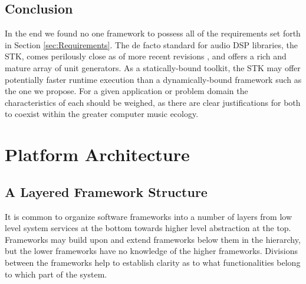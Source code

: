 \documentclass[twoside,10pt]{article}
\begin{document}


\subsection{Conclusion} %

In the end we found no one framework to possess all of the requirements set forth in Section \ref{sec:Requirements}.  The de facto standard for audio DSP libraries, the STK, comes perilously close as of more recent revisions \cite{Scavone:2005}, and offers a rich and mature array of unit generators.  As a statically-bound toolkit, the STK may offer potentially faster runtime execution than a dynamically-bound framework such as the one we propose.  For a given application or problem domain the characteristics of each should be weighed, as there are clear justifications for both to coexist within the greater computer music ecology.

%
%






\section{Platform Architecture} %

\subsection{A Layered Framework Structure}

It is common to organize software frameworks into a number of layers from low level system services at the bottom towards higher level abstraction at the top.  Frameworks may build upon and extend frameworks below them in the hierarchy, but the lower frameworks have no knowledge of the higher frameworks. Divisions between the frameworks help to establish clarity as to what functionalities belong to which part of the system. 
\end{document}
